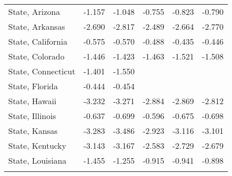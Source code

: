 {\begin{center}
{\begin{longtable}{l*{5}{c}}
            \addlinespace
            State, Arizona                   & -1.157\sym{**}        & -1.048\sym{**}        & -0.755                & -0.823\sym{*}         & -0.790                \\
            \addlinespace
            State, Arkansas                  & -2.690\sym{***}       & -2.817\sym{***}       & -2.489\sym{***}       & -2.664\sym{***}       & -2.770\sym{***}       \\
            \addlinespace
            State, California                & -0.575\sym{*}         & -0.570\sym{**}        & -0.488\sym{*}         & -0.435                & -0.446                \\
            \addlinespace
            State, Colorado                  & -1.446\sym{**}        & -1.423\sym{**}        & -1.463\sym{**}        & -1.521\sym{***}       & -1.508\sym{***}       \\
            \addlinespace
            State, Connecticut               & -1.401                & -1.550                &                       &                       &                       \\
            \addlinespace
            State, Florida                   & -0.444                & -0.454                &                       &                       &                       \\
            \addlinespace
            State, Hawaii                    & -3.232\sym{***}       & -3.271\sym{***}       & -2.884\sym{***}       & -2.869\sym{***}       & -2.812\sym{***}       \\
            \addlinespace
            State, Illinois                  & -0.637                & -0.699\sym{*}         & -0.596                & -0.675\sym{*}         & -0.698\sym{*}         \\
            \addlinespace
            State, Kansas                    & -3.283\sym{**}        & -3.486\sym{**}        & -2.923\sym{*}         & -3.116\sym{**}        & -3.101\sym{*}         \\
            \addlinespace
            State, Kentucky                  & -3.143\sym{***}       & -3.167\sym{***}       & -2.583\sym{***}       & -2.729\sym{***}       & -2.679\sym{***}       \\
            \addlinespace
            State, Louisiana                 & -1.455\sym{*}         & -1.255\sym{*}         & -0.915                & -0.941                & -0.898                \\
            \addlinespace

\end{longtable}}
\end{center}}
